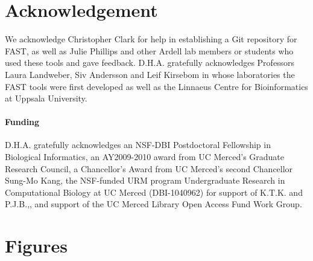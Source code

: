 \documentclass{frontiersSCNS} %
\begin{document}
\section*{Acknowledgement}
We acknowledge Christopher Clark for help in establishing a Git
repository for FAST, as well as Julie Phillips and other Ardell lab
members or students who used these tools and gave
feedback. D.H.A. gratefully acknowledges Professors Laura Landweber,
Siv Andersson and Leif Kirsebom in whose laboratories the FAST tools
were first developed as well as the Linnaeus Centre for Bioinformatics
at Uppsala University.

\paragraph{Funding\textcolon} D.H.A. gratefully acknowledges an
NSF-DBI Postdoctoral Fellowship in Biological Informatics, an
AY2009-2010 award from UC Merced's Graduate Research Council, a
Chancellor's Award from UC Merced's second Chancellor Sung-Mo Kang,
 the NSF-funded URM program Undergraduate Research in Computational
Biology at UC Merced (DBI-1040962) for support of K.T.K. and P.J.B.,,
and support of the UC Merced Library Open Access Fund Work Group.



\section*{Figures}
\end{document}
